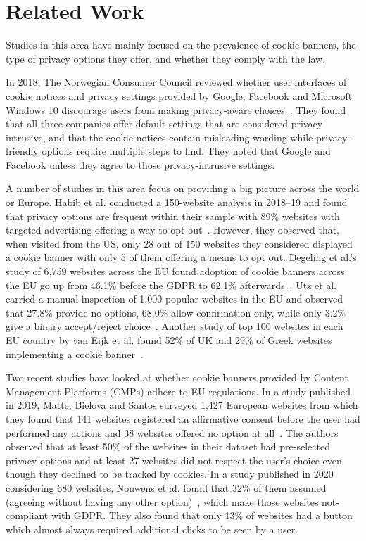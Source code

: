 \section{Related Work}
Studies in this area have mainly focused on the prevalence of cookie banners, the type of privacy options they offer, and whether they comply with the law.

In 2018, The Norwegian Consumer Council reviewed whether user interfaces of cookie notices and privacy settings provided by Google, Facebook and Microsoft Windows 10 discourage users from making privacy-aware choices~\cite{council2018deceived}. They found that all three companies offer default settings that are considered privacy intrusive, and that the cookie notices contain misleading wording while privacy-friendly options require multiple steps to find. 
They noted that Google and Facebook  unless they agree to those privacy-intrusive settings.

A number of studies in this area focus on providing a big picture across the world or Europe. 
Habib et al. conducted a 150-website analysis in 2018--19 and found that privacy options are frequent within their sample with 89\% websites with targeted advertising offering a way to opt-out~\cite{habib2019empirical}. However, they observed that, when visited from the US, only 28 out of 150 websites they considered displayed a cookie banner with only 5 of them offering a means to opt out. 
Degeling et al.'s study of 6,759 websites across the EU found adoption of cookie banners across the EU go up from 46.1\% before the GDPR to 62.1\% afterwards~\cite{degeling2018we}. 
Utz et al. carried a manual inspection of 1,000 popular websites in the EU and observed that 27.8\% provide no options, 68.0\% allow confirmation only, while only 3.2\% give a binary accept/reject choice~\cite{utz2019informed}. 
Another study of top 100 websites in each EU country by van Eijk et al. found 52\% of UK and 29\% of Greek websites implementing a cookie banner~\cite{eijk2019impact}. 

Two recent studies have looked at whether cookie banners provided by Content Management Platforms (CMPs) adhere to EU regulations. 
In a study published in 2019, Matte, Bielova and Santos surveyed 1,427 European websites from which they found that 141 websites registered an affirmative consent before the user had performed any actions and 38 websites offered no  option at all~\cite{matte2020cookie}. The authors observed that at least 50\% of the websites in their dataset had pre-selected privacy options and at least 27 websites did not respect the user’s choice even though they declined to be tracked by cookies. 
In a study published in 2020 considering 680 websites, Nouwens et al. found that 32\% of them assumed  (agreeing without having any other option)~\cite{nouwens2020dark}, which make those websites not-compliant with GDPR. They also found that only 13\% of websites had a  button which almost always required additional clicks to be seen by a user.

